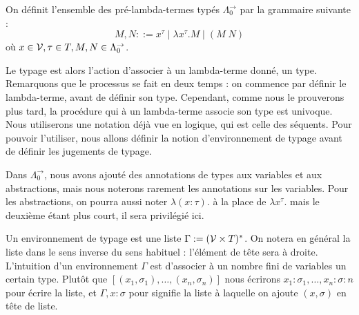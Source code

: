 \begin{defi}
    On définit l'ensemble des pré-lambda-termes typés $\Lambda_0^{\to}$ par la grammaire suivante :
    $$M,N ::= x^\tau\mid \lambda x^\tau.M\mid (M\;N)$$ où $x\in \mathcal V,\tau\in T, M,N\in \Lambda_0^{\to}$.
\end{defi}

Le typage est alors l'action d'associer à un lambda-terme donné, un type. Remarquons que le processus se fait en deux temps : on commence par définir le lambda-terme, avant de définir son type. Cependant, comme nous le prouverons plus tard, la procédure qui à un lambda-terme associe son type est univoque. Nous utiliserons une notation déjà vue en logique, qui est celle des séquents. Pour pouvoir l'utiliser, nous allons définir la notion d'environnement de typage avant de définir les jugements de typage.

Dans $\Lambda_0^{\to}$, nous avons ajouté des annotations de types aux variables et aux abstractions, mais nous noterons rarement les annotations sur les variables. Pour les abstractions, on pourra aussi noter $\lambda (x : \tau).$ à la place de $\lambda x^\tau.$ mais le deuxième étant plus court, il sera privilégié ici.

\begin{defi}
    Un environnement de typage est une liste $\Gamma := (\mathcal V\times T)^*$. On notera en général la liste dans le sens inverse du sens habituel : l'élément de tête sera à droite. L'intuition d'un environnement $\Gamma$ est d'associer à un nombre fini de variables un certain type. Plutôt que $[(x_1,\sigma_1),\ldots,(x_n,\sigma_n)]$ nous écrirons $x_1 : \sigma_1,\ldots,x_n : \sigma : n$ pour écrire la liste, et $\Gamma,x : \sigma$ pour signifie la liste à laquelle on ajoute $(x,\sigma)$ en tête de liste.
\end{defi}

